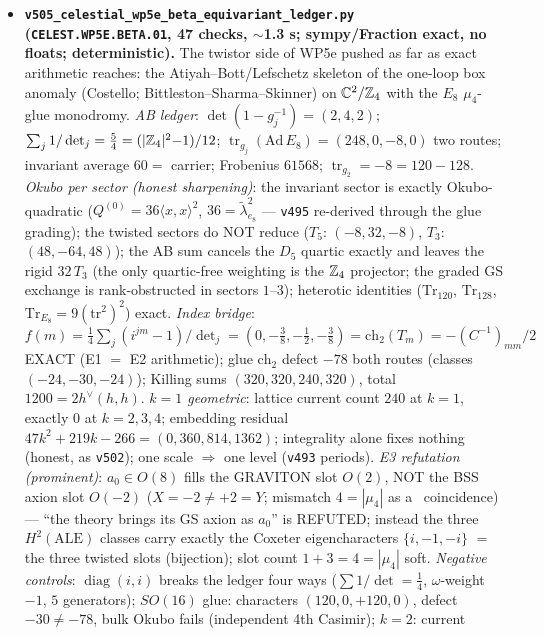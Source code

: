 \begin{itemize}[leftmargin=1.5em]
\item \textbf{\texttt{v505\_celestial\_wp5e\_beta\_equivariant\_ledger.py} (\texttt{CELEST.WP5E.BETA.01},
47 checks, $\sim$1.3 s; sympy/Fraction exact, no floats; deterministic).} The twistor side of WP5e
pushed as far as exact arithmetic reaches: the Atiyah--Bott/Lefschetz skeleton of the one-loop box
anomaly (Costello; Bittleston--Sharma--Skinner) on $\mathbb C^2/\mathbb{Z}_4$ with the $E_8$ $\mu_4$-glue
monodromy. \emph{AB ledger}: $\det(1-g_j^{-1})=(2,4,2)$; $\sum_j1/\det_j=\tfrac54=(|\mathbb{Z}_4|^2{-}1)/12$;
$\operatorname{tr}_{g_j}(\mathrm{Ad}\,E_8)=(248,0,-8,0)$ two routes; invariant average $60=$ carrier;
Frobenius $61568$; $\operatorname{tr}_{g_2}=-8=120-128$. \emph{Okubo per sector (honest
sharpening)}: the invariant sector is exactly Okubo-quadratic ($Q^{(0)}=36\langle x,x\rangle^2$,
$36=\tilde\lambda^2_{e_8}$ --- \texttt{v495} re-derived through the glue grading); the twisted
sectors do NOT reduce ($T_5$: $(-8,32,-8)$, $T_3$: $(48,-64,48)$); the AB sum cancels the $D_5$
quartic exactly and leaves the rigid $32\,T_3$ (the only quartic-free weighting is the $\mathbb{Z}_4$
projector; the graded GS exchange is rank-obstructed in sectors $1$--$3$); heterotic identities
($\mathrm{Tr}_{120}$, $\mathrm{Tr}_{128}$, $\mathrm{Tr}_{E_8}=9(\mathrm{tr}^2)^2$) exact.
\emph{Index bridge}: $f(m)=\tfrac14\sum_j(i^{jm}{-}1)/\det_j=(0,-\tfrac38,-\tfrac12,-\tfrac38)
=\mathrm{ch}_2(T_m)=-(C^{-1})_{mm}/2$ EXACT (E1 $=$ E2 arithmetic); glue $\mathrm{ch}_2$ defect
$-78$ both routes (classes $(-24,-30,-24)$); Killing sums $(320,320,240,320)$, total
$1200=2h^\vee(h,h)$. \emph{$k=1$ geometric}: lattice current count $240$ at $k{=}1$, exactly $0$ at
$k=2,3,4$; embedding residual $47k^2{+}219k{-}266=(0,360,814,1362)$; integrality alone fixes
nothing (honest, as \texttt{v502}); one scale $\Rightarrow$ one level (\texttt{v493} periods).
\emph{E3 refutation (prominent)}: $a_0\in O(8)$ fills the GRAVITON slot $O(2)$, NOT the BSS axion
slot $O(-2)$ ($X=-2\neq+2=Y$; mismatch $4=|\mu_4|$ as a \mC\ coincidence) --- ``the theory brings
its GS axion as $a_0$'' is REFUTED; instead the three $H^2(\mathrm{ALE})$ classes carry exactly the
Coxeter eigencharacters $\{i,-1,-i\}$ $=$ the three twisted slots (bijection); slot count $1{+}3=4
=|\mu_4|$ soft. \emph{Negative controls}: $\operatorname{diag}(i,i)$ breaks the ledger four ways
($\sum1/\det=\tfrac14$, $\omega$-weight $-1$, $5$ generators); $SO(16)$ glue: characters
$(120,0,+120,0)$, defect $-30\neq-78$, bulk Okubo fails (independent 4th Casimir); $k=2$: current

\end{itemize}
